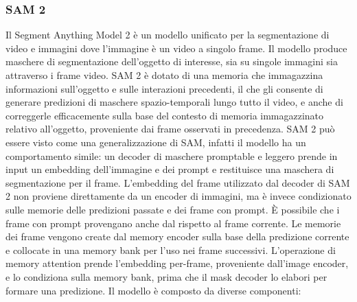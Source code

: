 \subsubsection{SAM 2}
Il Segment Anything Model 2 è un modello unificato per la segmentazione di video e immagini dove l'immagine è un video a singolo frame. Il modello produce maschere di segmentazione dell'oggetto di interesse, sia su singole immagini sia attraverso i frame video. SAM 2 è dotato di una memoria che immagazzina informazioni sull'oggetto e sulle interazioni precedenti, il che gli consente di generare predizioni di maschere spazio-temporali lungo tutto il video, e anche di correggerle efficacemente sulla base del contesto di memoria immagazzinato relativo all'oggetto, proveniente dai frame osservati in precedenza.
SAM 2 può essere visto come una generalizzazione di SAM, infatti il modello ha un comportamento simile: un decoder di maschere promptable e leggero prende in input un embedding dell'immagine e dei prompt e restituisce una maschera di segmentazione per il frame. L'embedding del frame utilizzato dal decoder di SAM 2 non proviene direttamente da un encoder di immagini, ma è invece condizionato sulle memorie delle predizioni passate e dei frame con prompt. È possibile che i frame con prompt provengano anche dal  rispetto al frame corrente. Le memorie dei frame vengono create dal memory encoder sulla base della predizione corrente e collocate in una memory bank per l'uso nei frame successivi. L'operazione di memory attention prende l'embedding per-frame, proveniente dall'image encoder, e lo condiziona sulla memory bank, prima che il mask decoder lo elabori per formare una predizione.
Il modello è composto da diverse componenti:
